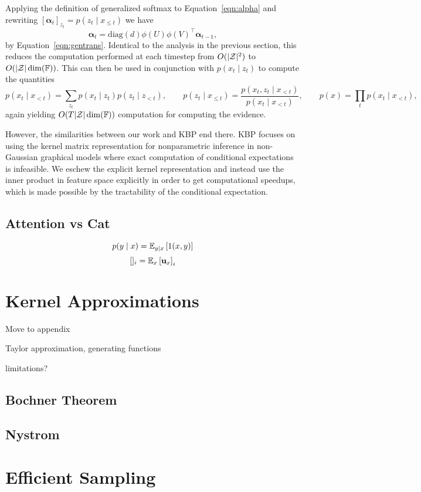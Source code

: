 \documentclass{article}
\begin{document}
Applying the definition of generalized softmax to Equation~\ref{eqn:alpha}
and rewriting $[\bm\alpha_t]_{z_t} = p(z_t \mid x_{\le t})$
we have
\begin{equation}
\bm\alpha_t = \textrm{diag}(d)\phi(U)\phi(V)^\top\bm\alpha_{t-1},
\end{equation}
by Equation~\ref{eqn:gentrans}.
Identical to the analysis in the previous section, this reduces the computation
performed at each timestep from $O(|\mathcal{Z}|^2)$ to $O(|\mathcal{Z}|\dim(\mathbb{F}))$.
This can then be used in conjunction with $p(x_t \mid z_t)$ to compute
the quantities
$$
p(x_t \mid x_{<t}) = \sum_{z_t}p(x_t \mid z_t)p(z_t \mid z_{<t}),
\qquad
p(z_t \mid x_{\le t}) = \frac{p(x_t, z_t \mid x_{<t})}{p(x_t \mid x_{<t})},
\qquad
p(x) = \prod_t p(x_t \mid x_{<t}),
$$
again yielding $O(T|\mathcal{Z}|\dim(\mathbb{F}))$ computation for computing the evidence.

However, the similarities between our work and KBP end there.
KBP focuses on using the kernel matrix representation for nonparametric inference
in non-Gaussian graphical models where exact computation of conditional expectations is
infeasible.
We eschew the explicit kernel representation and
instead use the inner product in feature space explicitly in order to get
computational speedups,
which is made possible by the tractability of the conditional expectation.


\subsection{Attention vs Cat}
$$p(y\mid x) = \mathbb{E}_{y\mid x}\left[1(x,y)\right]$$
$$[]_i = \mathbb{E}_{x}\left[\mathbf{u}_x\right]_i$$


\section{Kernel Approximations}
Move to appendix

Taylor approximation, generating functions

limitations?
\subsection{Bochner Theorem}
\subsection{Nystrom}

\section{Efficient Sampling}
\end{document}
